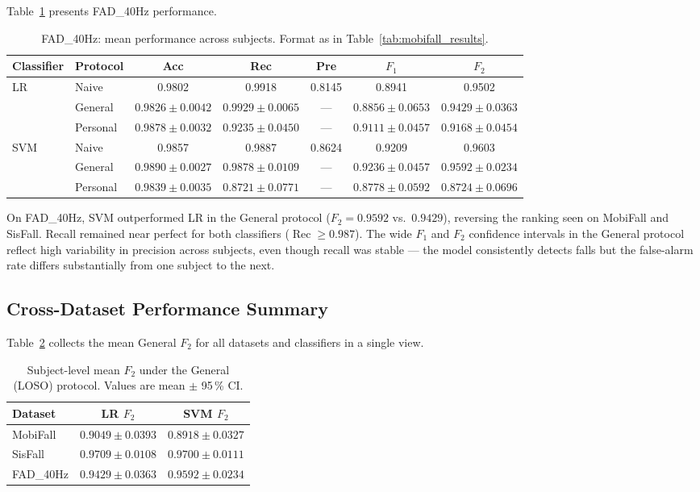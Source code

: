 \documentclass[onluarkali,ingilizce,yukseklisans,karton,LisansustuEgitim]{itutez}
\DeclareMathOperator{\Rec}{Rec}
\providecommand{\1}{\mathbf{1}}
\begin{document}
Table~\ref{tab:fad_results} presents FAD\_40Hz performance.

\begin{table}[h!]
\centering
\caption{FAD\_40Hz: mean performance across subjects.  Format as in
  Table~\ref{tab:mobifall_results}.}
\label{tab:fad_results}
\setlength{\tabcolsep}{3pt}\footnotesize
\begin{tabular}{llccccc}
\toprule
\textbf{Classifier} & \textbf{Protocol}
  & \textbf{Acc} & \textbf{Rec} & \textbf{Pre}
  & \textbf{$F_1$} & \textbf{$F_2$} \\
\midrule
\multirow{3}{*}{LR}
 & Naive
   & 0.9802 & 0.9918 & 0.8145 & 0.8941 & 0.9502 \\
 & General
   & $0.9826 \pm 0.0042$ & $0.9929 \pm 0.0065$ & ---
   & $0.8856 \pm 0.0653$ & $0.9429 \pm 0.0363$ \\
 & Personal
   & $0.9878 \pm 0.0032$ & $0.9235 \pm 0.0450$ & ---
   & $0.9111 \pm 0.0457$ & $0.9168 \pm 0.0454$ \\
\midrule
\multirow{3}{*}{SVM}
 & Naive
   & 0.9857 & 0.9887 & 0.8624 & 0.9209 & 0.9603 \\
 & General
   & $0.9890 \pm 0.0027$ & $0.9878 \pm 0.0109$ & ---
   & $0.9236 \pm 0.0457$ & $0.9592 \pm 0.0234$ \\
 & Personal
   & $0.9839 \pm 0.0035$ & $0.8721 \pm 0.0771$ & ---
   & $0.8778 \pm 0.0592$ & $0.8724 \pm 0.0696$ \\
\bottomrule
\end{tabular}
\end{table}

On FAD\_40Hz, SVM outperformed LR in the General protocol ($F_2 = 0.9592$ vs.\ $0.9429$), reversing the ranking seen on MobiFall and SisFall. Recall remained near perfect for both classifiers ($\Rec \geq 0.987$). The wide $F_1$ and $F_2$ confidence intervals in the General protocol reflect high variability in precision across subjects, even though recall was stable --- the model consistently detects falls but the false-alarm rate differs substantially from one subject to the next.

\subsection{Cross-Dataset Performance Summary}
\label{subsubsec:summary}

Table~\ref{tab:summary} collects the mean General $F_2$ for all datasets and classifiers in a single view.

\begin{table}[h!]
\centering
\caption{Subject-level mean $F_2$ under the General (LOSO) protocol.
  Values are mean $\pm$ 95\,\% CI.}
\label{tab:summary}
\begin{tabular}{lcc}
\toprule
\textbf{Dataset} & \textbf{LR $F_2$} & \textbf{SVM $F_2$} \\
\midrule
MobiFall   & $0.9049 \pm 0.0393$ & $0.8918 \pm 0.0327$ \\
SisFall    & $0.9709 \pm 0.0108$ & $0.9700 \pm 0.0111$ \\
FAD\_40Hz  & $0.9429 \pm 0.0363$ & $0.9592 \pm 0.0234$ \\
\bottomrule
\end{tabular}
\end{table}
\end{document}
